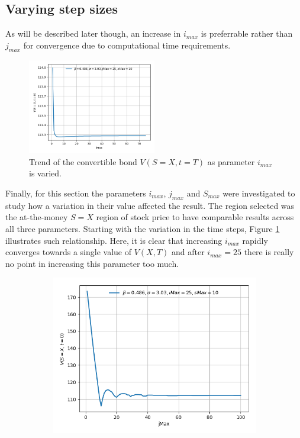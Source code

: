 \documentclass{article}
\begin{document}
\subsection{Varying step sizes}
As will be described later though, an increase in $i_{max}$ is preferrable rather than $j_{max}$ for convergence due to computational time requirements.
\begin{figure}[!h]
\includegraphics[width=0.5\textwidth,center]{../images/european_varying_imax.png}
\caption{Trend of the convertible bond $V(S=X,t=T)$ as parameter $i_{max}$ is varied.}
\label{fig:varying_imax}
\end{figure}
Finally, for this section the parameters $i_{max}$, $j_{max}$ and $S_{max}$ were investigated to study how a variation in their value affected the result.
The region selected was the at-the-money $S=X$ region of stock price to have comparable results across all three parameters.
Starting with the variation in the time steps, Figure \ref{fig:varying_imax} illustrates such relationship.
Here, it is clear that increasing $i_{max}$ rapidly converges towards a single value of $V(X,T)$ and after $i_{max}=25$ there is really no point in increasing this parameter too much.
\begin{figure}[!b]
\centering
\begin{minipage}{.55\textwidth}
  \centering
  \begin{subfigure}{\textwidth}
      \includegraphics[width=\linewidth]{../images/smax_jmax/10_european_varying_jmax.png}

  \end{subfigure}
  \label{fig:varying_jmax_10}
\end{minipage}
\end{figure}
\end{document}
